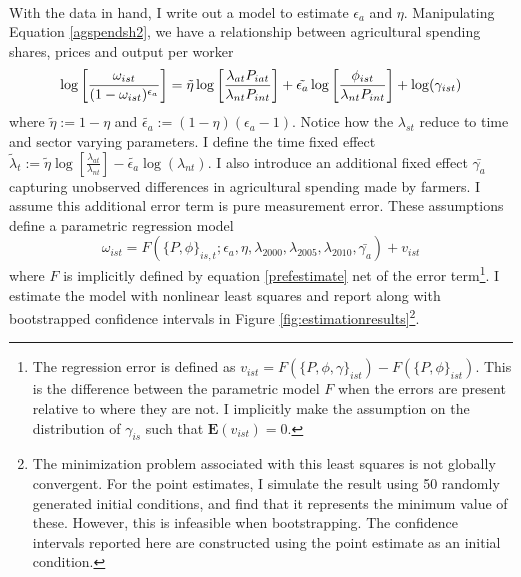 \documentclass[]{article}
\theoremstyle{plain}
\begin{document}
\paragraph*{}
With the data in hand, I write out a model to estimate $\epsilon_{a}$ and $\eta$. Manipulating Equation \eqref{agspendsh2}, we have a relationship between agricultural spending shares, prices and output per worker
\begin{equation}\label{prefestimate}
	\small
		\log\bigg[\frac{\omega_{ist}}{(1-\omega_{ist})^{\epsilon_{a}}}\bigg] =  \tilde{\eta}\log\bigg[\frac{\lambda_{at}P_{iat}}{\lambda_{nt}P_{int}}\bigg] + \tilde{\epsilon_{a}}\log\bigg[\frac{\phi_{ist}}{\lambda_{nt}P_{int}}\bigg] + \log(\gamma_{ist})
\end{equation}
where $\tilde{\eta} := 1-\eta$ and $\tilde{\epsilon_{a}} := (1-\eta)(\epsilon_{a} - 1)$. Notice how the $\lambda_{st}$ reduce to time and sector varying parameters. I define the time fixed effect $\tilde{\lambda}_{t} := \tilde{\eta}\log[\frac{\lambda_{at}}{\lambda_{nt}}] - \tilde{\epsilon_{a}}\log(\lambda_{nt})$. I also introduce an additional fixed effect $\bar{\gamma_{a}}$ capturing unobserved differences in agricultural spending made by farmers. I assume this additional error term is pure measurement error. These assumptions define a parametric regression model
\begin{equation}\label{model1}
		\omega_{ist} = F(\{P, \phi\}_{is,t} ; \epsilon_{a}, \eta, \lambda_{2000}, \lambda_{2005}, \lambda_{2010}, \bar{\gamma_{a}}) + v_{ist}
\end{equation} 
where $F$ is implicitly defined by equation \eqref{prefestimate} net of the error term\footnote{The regression error is defined as $v_{ist} =  F(\{P, \phi, \gamma\}_{ist}) - F(\{P, \phi\}_{ist})$. This is the difference between the parametric model $F$ when the errors are present relative to where they are not. I implicitly make the assumption on the distribution of $\gamma_{is}$ such that $\mathbf{E}(v_{ist}) = 0$.}. I estimate the model with nonlinear least squares and report along with bootstrapped confidence intervals in  Figure \ref{fig:estimationresults}\footnote{The minimization problem associated with this least squares is not globally convergent. For the point estimates, I simulate the result using 50 randomly generated initial conditions, and find that it represents the minimum value of these. However, this is infeasible when bootstrapping. The confidence intervals reported here are constructed using the point estimate as an initial condition.}.
\end{document}
